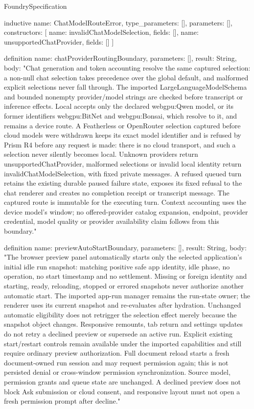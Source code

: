 \begin{lexlean}{FoundrySpecification}
\begin{semanticmodule}
inductive{
  name: ChatModelRouteError,
  type_parameters: [],
  parameters: [],
  constructors: [
    {name: invalidChatModelSelection, fields: []},
    {name: unsupportedChatProvider, fields: []}
  ]
}

definition{
  name: chatProviderRoutingBoundary,
  parameters: [],
  result: String,
  body: "Chat generation and token accounting resolve the same captured selection: a non-null chat selection takes precedence over the global default, and malformed explicit selections never fall through. The imported LargeLanguageModelSchema and bounded nonempty provider/model strings are checked before transcript or inference effects. Local accepts only the declared webgpu:Qwen model, or its former identifiers webgpu:BitNet and webgpu:Bonsai, which resolve to it, and remains a device route. A Featherless or OpenRouter selection captured before cloud models were withdrawn keeps its exact model identifier and is refused by Prism R4 before any request is made: there is no cloud transport, and such a selection never silently becomes local. Unknown providers return unsupportedChatProvider, malformed selections or invalid local identity return invalidChatModelSelection, with fixed private messages. A refused queued turn retains the existing durable paused failure state, exposes its fixed refusal to the chat renderer and creates no completion receipt or transcript message. The captured route is immutable for the executing turn. Context accounting uses the device model's window; no offered-provider catalog expansion, endpoint, provider credential, model quality or provider availability claim follows from this boundary."
}

definition{
  name: previewAutoStartBoundary,
  parameters: [],
  result: String,
  body: "The browser preview panel automatically starts only the selected application's initial idle run snapshot: matching positive safe app identity, idle phase, no operation, no start timestamp and no settlement. Missing or foreign identity and starting, ready, reloading, stopped or errored snapshots never authorize another automatic start. The imported app-run manager remains the run-state owner; the renderer uses its current snapshot and re-evaluates after hydration. Unchanged automatic eligibility does not retrigger the selection effect merely because the snapshot object changes. Responsive remounts, tab return and settings updates do not retry a declined preview or supersede an active run. Explicit existing start/restart controls remain available under the imported capabilities and still require ordinary preview authorization. Full document reload starts a fresh document-owned run session and may request permission again; this is not persisted denial or cross-window permission synchronization. Source model, permission grants and queue state are unchanged. A declined preview does not block Ask submission or cloud consent, and responsive layout must not open a fresh permission prompt after decline."
}
\end{semanticmodule}
\end{lexlean}
